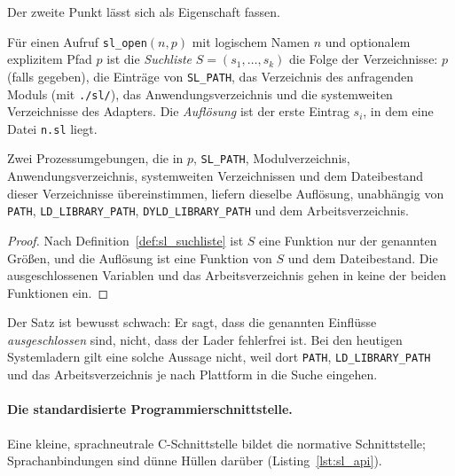 Der zweite Punkt lässt sich als Eigenschaft fassen.

\begin{definition}
	\label{def:sl_suchliste}
	Für einen Aufruf \texttt{sl\_open}$(n,p)$ mit logischem Namen $n$ und optionalem explizitem Pfad $p$ ist die \emph{Suchliste} $S=(s_1,\ldots,s_k)$ die Folge der Verzeichnisse: $p$ (falls gegeben), die Einträge von \texttt{SL\_PATH}, das Verzeichnis des anfragenden Moduls (mit \texttt{./sl/}), das Anwendungsverzeichnis und die systemweiten Verzeichnisse des Adapters. Die \emph{Auflösung} ist der erste Eintrag $s_i$, in dem eine Datei \texttt{n.sl} liegt.
\end{definition}

\begin{satz}
	\label{satz:sl_repro}
	Zwei Prozessumgebungen, die in $p$, \texttt{SL\_PATH}, Modulverzeichnis, Anwendungsverzeichnis, systemweiten Verzeichnissen und dem Dateibestand dieser Verzeichnisse übereinstimmen, liefern dieselbe Auflösung, unabhängig von \texttt{PATH}, \texttt{LD\_LIBRARY\_PATH}, \texttt{DYLD\_LIBRARY\_PATH} und dem Arbeitsverzeichnis.
\end{satz}

\begin{proof}
	Nach Definition~\ref{def:sl_suchliste} ist $S$ eine Funktion nur der genannten Größen, und die Auflösung ist eine Funktion von $S$ und dem Dateibestand. Die ausgeschlossenen Variablen und das Arbeitsverzeichnis gehen in keine der beiden Funktionen ein.
\end{proof}

Der Satz ist bewusst schwach: Er sagt, dass die genannten Einflüsse \emph{ausgeschlossen} sind, nicht, dass der Lader fehlerfrei ist. Bei den heutigen Systemladern gilt eine solche Aussage nicht, weil dort \texttt{PATH}, \texttt{LD\_LIBRARY\_PATH} und das Arbeitsverzeichnis je nach Plattform in die Suche eingehen.

\paragraph{Die standardisierte Programmierschnittstelle.}
Eine kleine, sprachneutrale C-Schnittstelle bildet die normative Schnittstelle; Sprachanbindungen sind dünne Hüllen darüber (Listing~\ref{lst:sl_api}).

